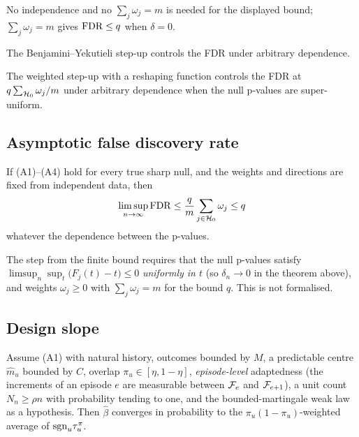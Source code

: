 \noindent No independence and no $\sum_j \omega_j = m$ is needed for the displayed bound; $\sum_j \omega_j = m$ gives $\mathrm{FDR} \le q$ when $\delta = 0$.


The Benjamini--Yekutieli step-up controls the FDR under arbitrary dependence.

The weighted step-up with a reshaping function controls the FDR at $q \sum_{\mathcal{H}_0} \omega_j / m$ under arbitrary dependence when the null p-values are super-uniform.

\subsection{Asymptotic false discovery rate}
\label{spec:thm.fdr}

\begin{corollary}
If (A1)--(A4) hold for every true sharp null, and the weights and directions are fixed from independent data, then
\begin{equation*}
\limsup_{n \to \infty} \mathrm{FDR} \le \frac{q}{m} \sum_{j \in \mathcal{H}_0} \omega_j \le q
\end{equation*}
whatever the dependence between the p-values.
\end{corollary}

\noindent The step from the finite bound requires that the null p-values satisfy $\limsup_n \sup_t \bigl(F_j(t) - t\bigr) \le 0$ \emph{uniformly in $t$} (so $\delta_n \to 0$ in the theorem above), and weights $\omega_j \ge 0$ with $\sum_j \omega_j = m$ for the bound $q$. This is not formalised.


\subsection{Design slope}
\label{spec:thm.slope}

\begin{theorem}
Assume (A1) with natural history, outcomes bounded by $M$, a predictable centre $\hat m_u$ bounded by $C$, overlap $\pi_u \in [\eta, 1-\eta]$, \emph{episode-level} adaptedness (the increments of an episode $e$ are measurable between $\mathcal{F}_{e}$ and $\mathcal{F}_{e+1}$), a unit count $N_n \ge \rho n$ with probability tending to one, and the bounded-martingale weak law as a hypothesis. Then $\hat\beta$ converges in probability to the $\pi_u(1-\pi_u)$-weighted average of $\mathrm{sgn}_u \tau_u^\pi$.
\end{theorem}

